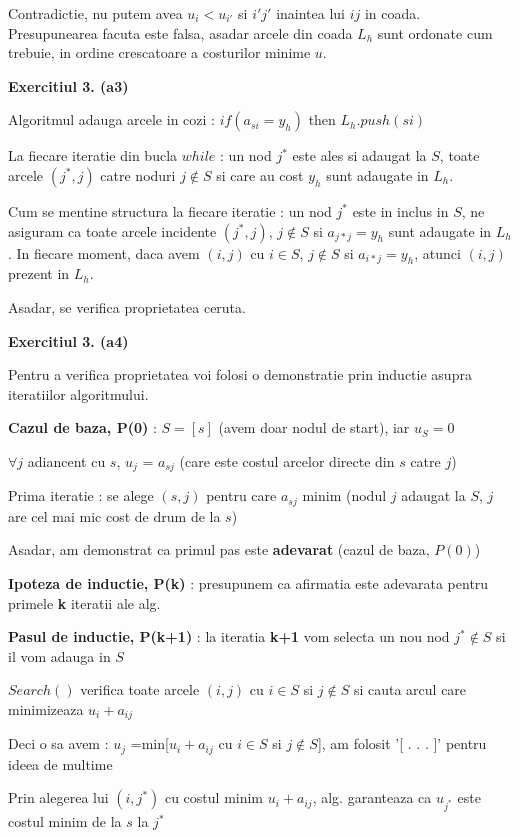 \documentclass{article}
\begin{document}
Contradictie, nu putem avea $u_i < u_{i'}$ si $i'j'$ inaintea lui $ij$ in coada.
Presupunearea facuta este falsa, asadar arcele din coada $L_h$ sunt ordonate cum trebuie, in ordine crescatoare a costurilor minime $u$.

\textbf{Exercitiul 3. (a3) }

Algoritmul adauga arcele in cozi : $if (a_{si} = y_h)$ then $L_h.push(si)$

La fiecare iteratie din bucla $while$ : un nod $j^*$ este ales si adaugat la $S$, toate arcele $(j^*,j)$ catre noduri $j \notin S$ si care au cost $y_h$ sunt adaugate in $L_h$.

Cum se mentine structura la fiecare iteratie : un nod $j^*$ este in inclus in $S$, ne asiguram ca toate arcele incidente $(j^*,j)$, $j \notin S$ si $a_{j*j} = y_h$ sunt adaugate in $L_h$. In fiecare moment, daca avem $(i,j)$ cu $i \in S$, $j \notin S$ si $a_{i*j} = y_h$, atunci $(i,j)$ prezent in $L_h$.

Asadar, se verifica proprietatea ceruta.

\textbf{Exercitiul 3. (a4) }

Pentru a verifica proprietatea voi folosi o demonstratie prin inductie asupra iteratiilor algoritmului.

\textbf{Cazul de baza, P(0)} : $S=[s]$ (avem doar nodul de start), iar $u_S=0$

$\forall j$ adiancent cu $s$, $u_j$ = $a_{sj}$ (care este costul arcelor directe din $s$ catre $j$)

Prima iteratie : se alege $(s,j)$ pentru care $a_{sj}$ minim (nodul $j$ adaugat la $S$, $j$ are cel mai mic cost de drum de la $s$)

Asadar, am demonstrat ca primul pas este \textbf{adevarat} (cazul de baza, $P(0)$)

\textbf{Ipoteza de inductie, P(k)} : presupunem ca afirmatia este adevarata pentru primele \textbf{k} iteratii ale alg.

\textbf{Pasul de inductie, P(k+1)} : la iteratia \textbf{k+1} vom selecta un nou nod $j^* \notin S$ si il vom adauga in $S$

$Search()$ verifica toate arcele $(i,j)$ cu $i \in S$ si $j \notin S$ si cauta arcul care minimizeaza $u_i + a_{ij}$

Deci o sa avem : $u_j$ =min[$u_i+a_{ij}$ cu $i \in S$ si $j \notin S$], am folosit '[ . . . ]' pentru ideea de multime

Prin alegerea lui $(i,j^*)$ cu costul minim $u_i + a_{ij}$, alg. garanteaza ca $u_{j^*}$ este costul minim de la $s$ la $j^*$
\end{document}
